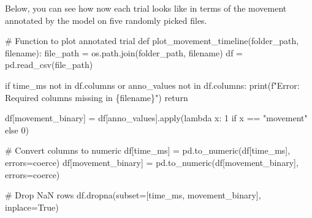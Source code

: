 \documentclass[
  letterpaper,
  DIV=11,
  numbers=noendperiod]{scrreprt}
\newenvironment{Shaded}{\begin{snugshade}}{\end{snugshade}}
\newcommand{\BuiltInTok}[1]{\textcolor[rgb]{0.00,0.23,0.31}{#1}}
\newcommand{\CommentTok}[1]{\textcolor[rgb]{0.37,0.37,0.37}{#1}}
\newcommand{\ControlFlowTok}[1]{\textcolor[rgb]{0.00,0.23,0.31}{#1}}
\newcommand{\DecValTok}[1]{\textcolor[rgb]{0.68,0.00,0.00}{#1}}
\newcommand{\KeywordTok}[1]{\textcolor[rgb]{0.00,0.23,0.31}{#1}}
\newcommand{\NormalTok}[1]{\textcolor[rgb]{0.00,0.23,0.31}{#1}}
\newcommand{\OperatorTok}[1]{\textcolor[rgb]{0.37,0.37,0.37}{#1}}
\newcommand{\SpecialCharTok}[1]{\textcolor[rgb]{0.37,0.37,0.37}{#1}}
\newcommand{\SpecialStringTok}[1]{\textcolor[rgb]{0.13,0.47,0.30}{#1}}
\newcommand{\StringTok}[1]{\textcolor[rgb]{0.13,0.47,0.30}{#1}}
\newcommand{\VariableTok}[1]{\textcolor[rgb]{0.07,0.07,0.07}{#1}}
\begin{document}
Below, you can see how now each trial looks like in terms of the
movement annotated by the model on five randomly picked files.

\begin{Shaded}
\begin{Highlighting}[]
\CommentTok{\# Function to plot annotated trial}
\KeywordTok{def}\NormalTok{ plot\_movement\_timeline(folder\_path, filename):}
\NormalTok{    file\_path }\OperatorTok{=}\NormalTok{ os.path.join(folder\_path, filename)}
\NormalTok{    df }\OperatorTok{=}\NormalTok{ pd.read\_csv(file\_path)}

    \ControlFlowTok{if} \StringTok{\textquotesingle{}time\_ms\textquotesingle{}} \KeywordTok{not} \KeywordTok{in}\NormalTok{ df.columns }\KeywordTok{or} \StringTok{\textquotesingle{}anno\_values\textquotesingle{}} \KeywordTok{not} \KeywordTok{in}\NormalTok{ df.columns:}
        \BuiltInTok{print}\NormalTok{(}\SpecialStringTok{f"Error: Required columns missing in }\SpecialCharTok{\{}\NormalTok{filename}\SpecialCharTok{\}}\SpecialStringTok{"}\NormalTok{)}
        \ControlFlowTok{return}

\NormalTok{    df[}\StringTok{\textquotesingle{}movement\_binary\textquotesingle{}}\NormalTok{] }\OperatorTok{=}\NormalTok{ df[}\StringTok{\textquotesingle{}anno\_values\textquotesingle{}}\NormalTok{].}\BuiltInTok{apply}\NormalTok{(}\KeywordTok{lambda}\NormalTok{ x: }\DecValTok{1} \ControlFlowTok{if}\NormalTok{ x }\OperatorTok{==} \StringTok{"movement"} \ControlFlowTok{else} \DecValTok{0}\NormalTok{)}

    \CommentTok{\# Convert columns to numeric}
\NormalTok{    df[}\StringTok{\textquotesingle{}time\_ms\textquotesingle{}}\NormalTok{] }\OperatorTok{=}\NormalTok{ pd.to\_numeric(df[}\StringTok{\textquotesingle{}time\_ms\textquotesingle{}}\NormalTok{], errors}\OperatorTok{=}\StringTok{\textquotesingle{}coerce\textquotesingle{}}\NormalTok{)}
\NormalTok{    df[}\StringTok{\textquotesingle{}movement\_binary\textquotesingle{}}\NormalTok{] }\OperatorTok{=}\NormalTok{ pd.to\_numeric(df[}\StringTok{\textquotesingle{}movement\_binary\textquotesingle{}}\NormalTok{], errors}\OperatorTok{=}\StringTok{\textquotesingle{}coerce\textquotesingle{}}\NormalTok{)}

    \CommentTok{\# Drop NaN rows}
\NormalTok{    df.dropna(subset}\OperatorTok{=}\NormalTok{[}\StringTok{\textquotesingle{}time\_ms\textquotesingle{}}\NormalTok{, }\StringTok{\textquotesingle{}movement\_binary\textquotesingle{}}\NormalTok{], inplace}\OperatorTok{=}\VariableTok{True}\NormalTok{)}


\end{Highlighting}
\end{Shaded}
\end{document}
